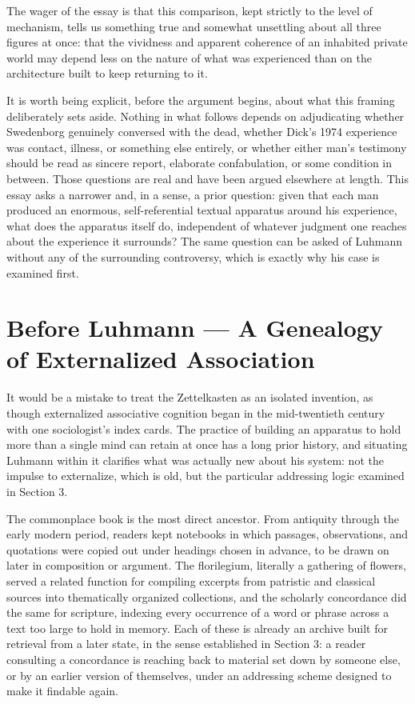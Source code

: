 \documentclass[11pt]{article}
\begin{document}
The wager of the essay is that this comparison, kept strictly to the level of mechanism, tells us something true and somewhat unsettling about all three figures at once: that the vividness and apparent coherence of an inhabited private world may depend less on the nature of what was experienced than on the architecture built to keep returning to it.

It is worth being explicit, before the argument begins, about what this framing deliberately sets aside. Nothing in what follows depends on adjudicating whether Swedenborg genuinely conversed with the dead, whether Dick's 1974 experience was contact, illness, or something else entirely, or whether either man's testimony should be read as sincere report, elaborate confabulation, or some condition in between. Those questions are real and have been argued elsewhere at length. This essay asks a narrower and, in a sense, a prior question: given that each man produced an enormous, self-referential textual apparatus around his experience, what does the apparatus itself do, independent of whatever judgment one reaches about the experience it surrounds? The same question can be asked of Luhmann without any of the surrounding controversy, which is exactly why his case is examined first.

\section{Before Luhmann --- A Genealogy of Externalized Association}

It would be a mistake to treat the Zettelkasten as an isolated invention, as though externalized associative cognition began in the mid-twentieth century with one sociologist's index cards. The practice of building an apparatus to hold more than a single mind can retain at once has a long prior history, and situating Luhmann within it clarifies what was actually new about his system: not the impulse to externalize, which is old, but the particular addressing logic examined in Section 3.

The commonplace book is the most direct ancestor. From antiquity through the early modern period, readers kept notebooks in which passages, observations, and quotations were copied out under headings chosen in advance, to be drawn on later in composition or argument. The florilegium, literally a gathering of flowers, served a related function for compiling excerpts from patristic and classical sources into thematically organized collections, and the scholarly concordance did the same for scripture, indexing every occurrence of a word or phrase across a text too large to hold in memory. Each of these is already an archive built for retrieval from a later state, in the sense established in Section 3: a reader consulting a concordance is reaching back to material set down by someone else, or by an earlier version of themselves, under an addressing scheme designed to make it findable again.
\end{document}
